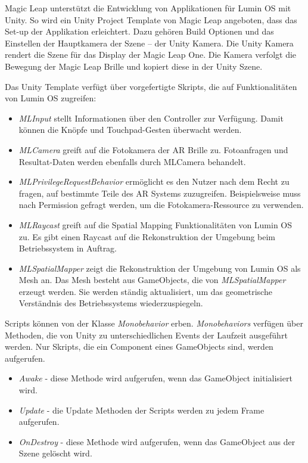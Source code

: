 Magic Leap unterstützt die Entwicklung von Applikationen für Lumin OS mit Unity. So wird ein Unity Project Template von Magic Leap angeboten, dass das Set-up der Applikation erleichtert. Dazu gehören Build Optionen und das Einstellen der Hauptkamera der Szene – der Unity Kamera. Die Unity Kamera rendert die Szene für das Display der Magic Leap One. Die Kamera verfolgt die Bewegung der Magic Leap Brille und kopiert diese in der Unity Szene. \citep{mlgetstarted}%

Das Unity Template verfügt über vorgefertigte Skripts, die auf Funktionalitäten von Lumin OS zugreifen:

\begin{itemize}
	\item \textit{MLInput} stellt Informationen über den Controller zur Verfügung. Damit können die Knöpfe und Touchpad-Gesten überwacht werden.
	\item \textit{MLCamera} greift auf die Fotokamera der AR Brille zu. Fotoanfragen und Resultat-Daten werden ebenfalls durch MLCamera behandelt.
	\item \textit{MLPrivilegeRequestBehavior} ermöglicht es den Nutzer nach dem Recht zu fragen, auf bestimmte Teile des AR Systems zuzugreifen. Beispielsweise muss nach Permission gefragt werden, um die Fotokamera-Ressource zu verwenden. 
	\item \textit{MLRaycast} greift auf die Spatial Mapping Funktionalitäten von Lumin OS zu. Es gibt einen Raycast auf die Rekonstruktion der Umgebung beim Betriebssystem in Auftrag. 
	\item \textit{MLSpatialMapper} zeigt die Rekonstruktion der Umgebung von Lumin OS als Mesh an. Das Mesh besteht aus GameObjects, die von \textit{MLSpatialMapper} erzeugt werden. Sie werden ständig aktualisiert, um das geometrische Verständnis des Betriebssystems wiederzuspiegeln.
\end{itemize}

Scripts können von der Klasse \textit{Monobehavior} erben. \textit{Monobehaviors} verfügen über Methoden, die von Unity zu unterschiedlichen Events der Laufzeit ausgeführt werden. Nur Skripts, die ein Component eines GameObjects sind, werden aufgerufen.

\begin{itemize}
	\item \textit{Awake} - diese Methode wird aufgerufen, wenn das GameObject initialisiert wird. %
	\item \textit{Update} - die Update Methoden der Scripts werden zu jedem Frame aufgerufen.
	\item \textit{OnDestroy} - diese Methode wird aufgerufen, wenn das GameObject aus der Szene gelöscht wird.
\end{itemize}

